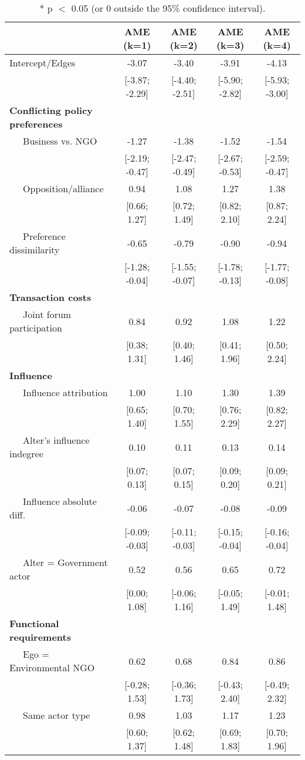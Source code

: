 \begin{table}[ht]
\centering
\begingroup\tiny
\begin{tabular}{lcccc}
   & AME (k=1) & AME (k=2) & AME (k=3) & AME (k=4) \\ 
  \hline
\hline
Intercept/Edges & -3.07 & -3.40 & -3.91 & -4.13 \\ 
   & [-3.87; -2.29] & [-4.40; -2.51] & [-5.90; -2.82] & [-5.93; -3.00] \\ 
  \textbf{Conflicting policy preferences} &  &  &  &  \\ 
  $\;\;\;\;$ Business vs. NGO & -1.27 & -1.38 & -1.52 & -1.54 \\ 
   & [-2.19; -0.47] & [-2.47; -0.49] & [-2.67; -0.53] & [-2.59; -0.47] \\ 
  $\;\;\;\;$ Opposition/alliance & 0.94 & 1.08 & 1.27 & 1.38 \\ 
   & [0.66; 1.27] & [0.72; 1.49] & [0.82; 2.10] & [0.87; 2.24] \\ 
  $\;\;\;\;$ Preference dissimilarity & -0.65 & -0.79 & -0.90 & -0.94 \\ 
   & [-1.28; -0.04] & [-1.55; -0.07] & [-1.78; -0.13] & [-1.77; -0.08] \\ 
  \textbf{Transaction costs} &  &  &  &  \\ 
  $\;\;\;\;$ Joint forum participation & 0.84 & 0.92 & 1.08 & 1.22 \\ 
   & [0.38; 1.31] & [0.40; 1.46] & [0.41; 1.96] & [0.50; 2.24] \\ 
  \textbf{Influence} &  &  &  &  \\ 
  $\;\;\;\;$ Influence attribution & 1.00 & 1.10 & 1.30 & 1.39 \\ 
   & [0.65; 1.40] & [0.70; 1.55] & [0.76; 2.29] & [0.82; 2.27] \\ 
  $\;\;\;\;$ Alter's influence indegree & 0.10 & 0.11 & 0.13 & 0.14 \\ 
   & [0.07; 0.13] & [0.07; 0.15] & [0.09; 0.20] & [0.09; 0.21] \\ 
  $\;\;\;\;$ Influence absolute diff. & -0.06 & -0.07 & -0.08 & -0.09 \\ 
   & [-0.09; -0.03] & [-0.11; -0.03] & [-0.15; -0.04] & [-0.16; -0.04] \\ 
  $\;\;\;\;$ Alter = Government actor & 0.52 & 0.56 & 0.65 & 0.72 \\ 
   & [0.00; 1.08] & [-0.06; 1.16] & [-0.05; 1.49] & [-0.01; 1.48] \\ 
  \textbf{Functional requirements} &  &  &  &  \\ 
  $\;\;\;\;$ Ego = Environmental NGO & 0.62 & 0.68 & 0.84 & 0.86 \\ 
   & [-0.28; 1.53] & [-0.36; 1.73] & [-0.43; 2.40] & [-0.49; 2.32] \\ 
  $\;\;\;\;$ Same actor type & 0.98 & 1.03 & 1.17 & 1.23 \\ 
   & [0.60; 1.37] & [0.62; 1.48] & [0.69; 1.83] & [0.70; 1.96] \\ 
   \hline
\hline
\end{tabular}
\endgroup
\caption{* p $<$ 0.05 (or 0 outside the 95\% confidence interval).} 
\label{tab:regTable_latSpace}
\end{table}
